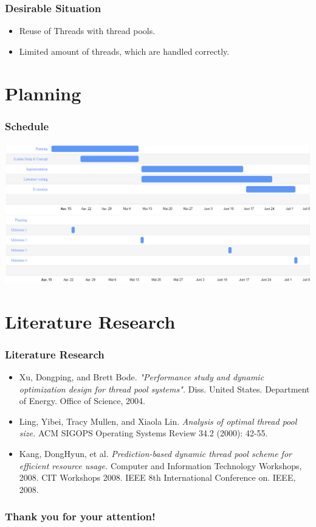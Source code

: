 \documentclass{beamer}
\begin{document}
	\begin{frame}
		\frametitle{Desirable Situation}
		\begin{itemize}
			\item Reuse of Threads with thread pools.
			\item Limited amount of threads, which are handled correctly.
		\end{itemize}
	\end{frame}

\section{Planning}
\begin{frame}
\frametitle{Schedule}
\includegraphics[width=1.0\textwidth]{img/schedule.png}
\end{frame}

\section{Literature Research}
    \begin{frame}
        \frametitle{Literature Research}
        \begin{itemize}
            \item Xu, Dongping, and Brett Bode. \emph{"Performance study and dynamic optimization design for thread pool systems".} Diss. United States. Department of Energy. Office of Science, 2004.
            \item Ling, Yibei, Tracy Mullen, and Xiaola Lin. \emph{Analysis of optimal thread pool size.} ACM SIGOPS Operating Systems Review 34.2 (2000): 42-55.
            \item Kang, DongHyun, et al. \emph{Prediction-based dynamic thread pool scheme for efficient resource usage.} Computer and Information Technology Workshops, 2008. CIT Workshops 2008. IEEE 8th International Conference on. IEEE, 2008.
        \end{itemize}
    \end{frame}

    \begin{frame}
        \frametitle{Thank you for your attention!}
    \end{frame}
\end{document}
